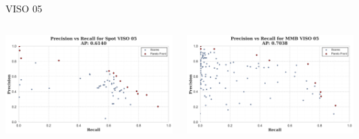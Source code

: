 \begin{frame}{VISO 05}
    \begin{columns}
        \begin{column}{0.5\textwidth}
            \centering
            \includegraphics[width=\textwidth,keepaspectratio]{images/bom/precision_recall_Spot_VISO_05.png}
        \end{column}
        \begin{column}{0.5\textwidth}
            \centering
            \includegraphics[width=\textwidth,keepaspectratio]{images/bom/precision_recall_MMB_VISO_05.png}
        \end{column}
    \end{columns}
\end{frame}

